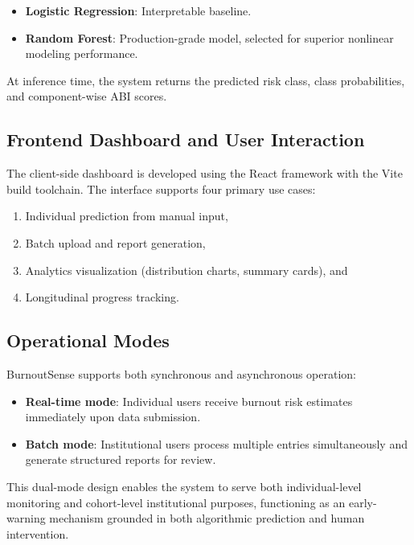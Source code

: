 \documentclass[conference]{IEEEtran}
\begin{document}
\begin{itemize}[leftmargin=*]
    \item \textbf{Logistic Regression}: Interpretable baseline.
    \item \textbf{Random Forest}: Production-grade model, selected for superior nonlinear modeling performance.
\end{itemize}

At inference time, the system returns the predicted risk class, class probabilities, and component-wise ABI scores.

\subsection{Frontend Dashboard and User Interaction}

The client-side dashboard is developed using the React framework with the Vite build toolchain. The interface supports four primary use cases:
\begin{enumerate}[leftmargin=*]
    \item Individual prediction from manual input,
    \item Batch upload and report generation,
    \item Analytics visualization (distribution charts, summary cards), and
    \item Longitudinal progress tracking.
\end{enumerate}

\subsection{Operational Modes}

BurnoutSense supports both synchronous and asynchronous operation:
\begin{itemize}[leftmargin=*]
    \item \textbf{Real-time mode}: Individual users receive burnout risk estimates immediately upon data submission.
    \item \textbf{Batch mode}: Institutional users process multiple entries simultaneously and generate structured reports for review.
\end{itemize}

This dual-mode design enables the system to serve both individual-level monitoring and cohort-level institutional purposes, functioning as an early-warning mechanism grounded in both algorithmic prediction and human intervention.

\end{document}
